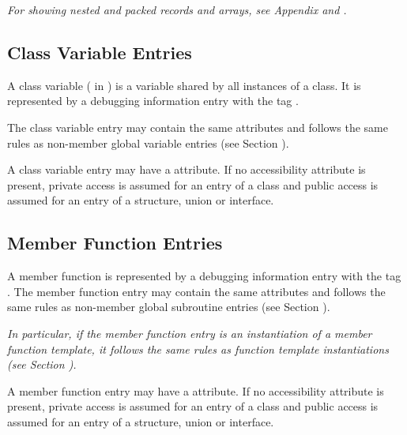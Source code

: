 \textit{For showing nested and packed records and arrays,
see Appendix  and
.}

\subsection{Class Variable Entries}
\label{chap:classvariableentries}
A class variable ( in
) is a variable shared by all instances
of a class. It is represented by a
debugging information entry with the tag \DWTAGvariable.

The class variable entry
may contain the same attributes and follows the same rules
as non-member global variable entries
(see Section ).

A class variable entry may have a
\hyperlink{chap:DWATaccessibilityattribute}{\DWATaccessibilityNAME}
attribute. If no accessibility attribute is present, private
access is assumed for an entry of a class and public access
is assumed for an entry of a structure, union or interface.

\subsection{Member Function Entries}
\label{chap:memberfunctionentries}

A member function is represented by a
debugging information entry
with the
tag \DWTAGsubprogram.
The member function entry
may contain the same attributes and follows the same rules
as non-member global subroutine entries
(see Section ).

\textit{In particular, if the member function entry is an
instantiation of a member function template, it follows the
same rules as function template instantiations (see Section
).
}

A member function entry may have a
\hyperlink{chap:DWATaccessibilityattribute}{\DWATaccessibilityNAME}
attribute. If no accessibility attribute is present, private
access is assumed for an entry of a class and public access
is assumed for an entry of a structure, union or interface.

